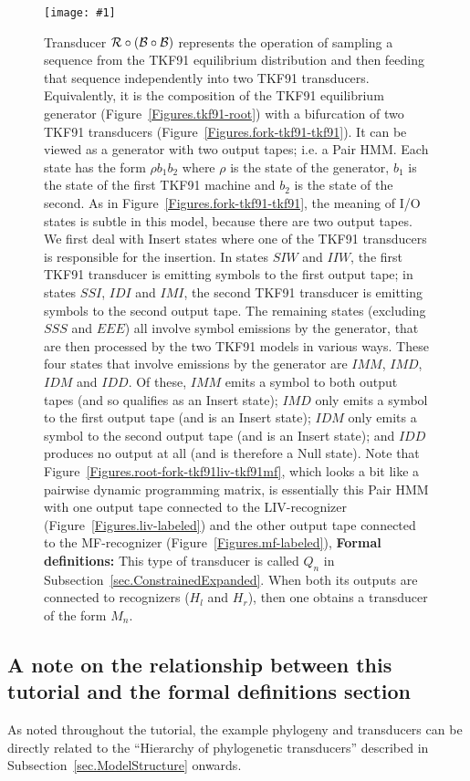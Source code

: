 \documentclass{article}
\newcommand{\secref}[1]{Subsection~\ref{sec.#1}}
\newcommand{\seclabel}[1]{\label{sec.#1}}
\newcommand{\figref}[1]{Figure~\ref{Figures.#1}}
\newcommand{\figlabel}[1]{\label{Figures.#1}}
\newcommand{\easyfig}[4]{
\begin{figure}
\texttt{[image: \#1]}
\caption{ \figlabel{#3} #4}
\end{figure}}
\newcommand{\widepdffig}[2]{\easyfig{#1-fig.pdf}{width=\textwidth}{#1}{#2}}
\newcommand\tkf{{\cal B}}
\newcommand\tkfroot{{\cal R}}
\newcommand\formaldefs{{\bf Formal definitions: }}
\newcommand\fork{\circ}
\begin{document}
\widepdffig{root-fork-tkf91-tkf91}{
Transducer $\tkfroot \circ (\tkf \fork \tkf)$ represents the operation
of sampling a sequence from the TKF91 equilibrium distribution
and then feeding that sequence independently into two TKF91 transducers.
Equivalently, it is the composition of the TKF91 equilibrium generator (\figref{tkf91-root})
with a bifurcation of two TKF91 transducers (\figref{fork-tkf91-tkf91}).
It can be viewed as a generator with two output tapes; i.e. a Pair HMM.
Each state has the form $\rho b_1 b_2$ where
 $\rho$ is the state of the generator,
 $b_1$ is the state of the first TKF91 machine and $b_2$ is the state of the second.
As in \figref{fork-tkf91-tkf91},
the meaning of I/O states is subtle in this model, because there are two output tapes.
We first deal with Insert states where one of the TKF91 transducers is responsible for the insertion.
In states $SIW$ and $IIW$, the first TKF91 transducer is emitting symbols to the first output tape;
in states $SSI$, $IDI$ and $IMI$, the second TKF91 transducer is emitting symbols to the second output tape.
The remaining states (excluding $SSS$ and $EEE$) all involve symbol emissions by the generator,
that are then processed by the two TKF91 models in various ways.
These four states that involve emissions by the generator
are $IMM$, $IMD$, $IDM$ and $IDD$.
Of these,
$IMM$ emits a symbol to both output tapes (and so qualifies as an Insert state);
$IMD$ only emits a symbol to the first output tape (and is an Insert state);
$IDM$ only emits a symbol to the second output tape (and is an Insert state);
and $IDD$ produces no output at all (and is therefore a Null state).
Note that \figref{root-fork-tkf91liv-tkf91mf},
which looks a bit like a pairwise dynamic programming matrix,
is essentially
this Pair HMM with one output tape connected to the LIV-recognizer (\figref{liv-labeled})
and the other output tape connected to the MF-recognizer (\figref{mf-labeled}),
\formaldefs
This type of transducer is called $Q_n$ in \secref{ConstrainedExpanded}.
When both its outputs are connected to recognizers ($H_l$ and $H_r$),
then one obtains a transducer of the form $M_n$.
}

\subsection{A note on the relationship between this tutorial and the formal definitions section}
\seclabel{FormalTutorialRelationship}

As noted throughout the tutorial, the example phylogeny and transducers can be directly related to the ``Hierarchy of phylogenetic transducers''
described in \secref{ModelStructure} onwards.
\end{document}
